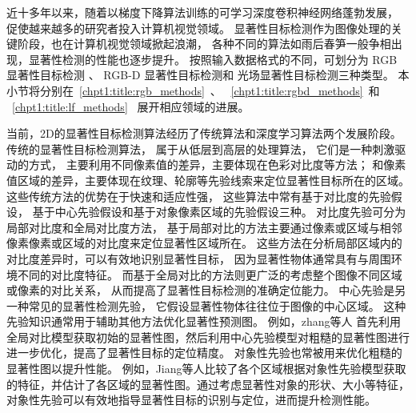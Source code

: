 


近十多年以来，随着以梯度下降算法训练的可学习深度卷积神经网络蓬勃发展，
促使越来越多的研究者投入计算机视觉领域。
显著性目标检测作为图像处理的关键阶段，也在计算机视觉领域掀起浪潮，
各种不同的算法如雨后春笋一般争相出现，显著性检测的性能也逐步提升。
按照输入数据格式的不同，可划分为
RGB 显著性目标检测
、
RGB-D 显著性目标检测和
光场显著性目标检测三种类型。
本小节将分别在~\ref{chpt1:title:rgb_methods}~、
~\ref{chpt1:title:rgbd_methods}~和
~\ref{chpt1:title:lf_methods}~
展开相应领域的进展。



\label{chpt1:title:rgb_methods}


当前，2D的显著性目标检测算法经历了传统算法和深度学习算法两个发展阶段。
传统的显著性目标检测算法，
属于从低层到高层的处理算法，
它们是一种刺激驱动的方式，
主要利用不同像素值的差异，主要体现在色彩对比度等方法；
和像素值区域的差异，主要体现在纹理、轮廓等先验线索来定位显著性目标所在的区域。
这些传统方法的优势在于快速和适应性强，
这些算法中常有基于对比度的先验假设，
基于中心先验假设和基于对象像素区域的先验假设三种。
对比度先验可分为局部对比度和全局对比度方法，
基于局部对比的方法主要通过像素或区域与相邻像素像素或区域的对比度来定位显著性区域所在。
这些方法在分析局部区域内的对比度差异时，可以有效地识别显著性目标，
因为显著性物体通常具有与周围环境不同的对比度特征。
而基于全局对比的方法则更广泛的考虑整个图像不同区域或像素的对比关系，
从而提高了显著性目标检测的准确定位能力。
中心先验是另一种常见的显著性检测先验，
它假设显著性物体往往位于图像的中心区域。
这种先验知识通常用于辅助其他方法优化显著性预测图。
例如，zhang等人
首先利用全局对比模型获取初始的显著性图，然后利用中心先验模型对粗糙的显著性图进行进一步优化，提高了显著性目标的定位精度。
对象性先验也常被用来优化粗糙的显著性图以提升性能。
例如，Jiang等人比较了各个区域根据对象性先验模型获取的特征，并估计了各区域的显著性图。通过考虑显著性对象的形状、大小等特征，对象性先验可以有效地指导显著性目标的识别与定位，进而提升检测性能。







